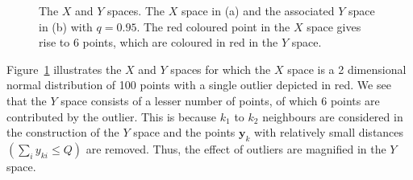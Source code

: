 \documentclass[11pt]{article}
\begin{document}
\begin{figure}[!t]
	\centering
	\caption{The $X$ and $Y$ spaces. The $X$ space in (a) and the associated $Y$ space in (b) with $q = 0.95$. The red coloured point in the $X$ space gives rise to 6   points, which are coloured in red in the $Y$ space.}
	\label{fig:XandY}
\end{figure} 

Figure~\ref{fig:XandY} illustrates  the $X$ and $Y$ spaces for which the $X$ space is a 2 dimensional normal distribution of 100 points with a single outlier depicted in red. We see that the $Y$ space consists of a lesser number of points, of which 6 points are contributed by the outlier. This is because $k_1$ to $k_2$ neighbours are considered in the construction of the $Y$ space and the  points $\bm{y}_k$ with relatively small distances $\left(\sum_i y_{ki} \leq Q\right)$ are removed. Thus, the effect of outliers are magnified in the $Y$ space. \\
\end{document}
